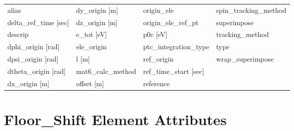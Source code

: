  \begin{tabular}{llll} \toprule
alias                            & dy_origin [m]                    & origin_ele                       & spin_tracking_method             \\
delta_ref_time [sec]             & dz_origin [m]                    & origin_ele_ref_pt                & superimpose                      \\
descrip                          & e_tot [eV]                       & p0c [eV]                         & tracking_method                  \\
dphi_origin [rad]                & ele_origin                       & ptc_integration_type             & type                             \\
dpsi_origin [rad]                & l [m]                            & ref_origin                       & wrap_superimpose                 \\
dtheta_origin [rad]              & mat6_calc_method                 & ref_time_start [sec]             &                                  \\
dx_origin [m]                    & offset [m]                       & reference                        &                                  \\
 \bottomrule
 \end{tabular}
 \vfill
 
 \section{Floor_Shift Element Attributes}
 \label{s:list.floor.shift}
 
